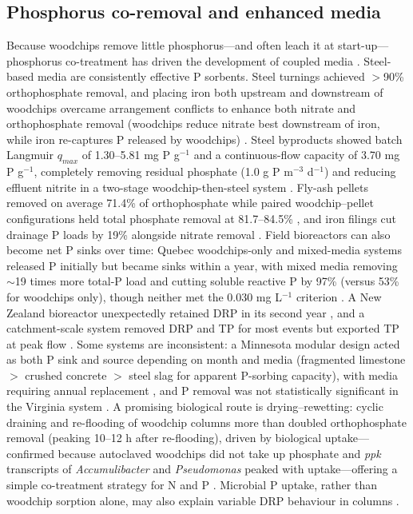 \documentclass[11pt]{article}
\begin{document}
\subsection{Phosphorus co-removal and enhanced media}

Because woodchips remove little phosphorus---and often leach it at start-up---phosphorus co-treatment has driven the development of coupled media \parencite{Christianson2021}. Steel-based media are consistently effective P sorbents. Steel turnings achieved $>$90\% orthophosphate removal, and placing iron both upstream and downstream of woodchips overcame arrangement conflicts to enhance both nitrate and orthophosphate removal (woodchips reduce nitrate best downstream of iron, while iron re-captures P released by woodchips) \parencite{Goodwin2015}. Steel byproducts showed batch Langmuir $q_{max}$ of 1.30--5.81 mg P g$^{-1}$ and a continuous-flow capacity of 3.70 mg P g$^{-1}$, completely removing residual phosphate (1.0 g P m$^{-3}$ d$^{-1}$) and reducing effluent nitrite in a two-stage woodchip-then-steel system \parencite{Hua2016}. Fly-ash pellets removed on average 71.4\% of orthophosphate while paired woodchip--pellet configurations held total phosphate removal at 81.7--84.5\% \parencite{Li2018b}, and iron filings cut drainage P loads by 19\% alongside nitrate removal \parencite{Oladeji2023}. Field bioreactors can also become net P sinks over time: Quebec woodchips-only and mixed-media systems released P initially but became sinks within a year, with mixed media removing $\sim$19 times more total-P load and cutting soluble reactive P by 97\% (versus 53\% for woodchips only), though neither met the 0.030 mg L$^{-1}$ criterion \parencite{Husk2018}. A New Zealand bioreactor unexpectedly retained DRP in its second year \parencite{Rivas2020}, and a catchment-scale system removed DRP and TP for most events but exported TP at peak flow \parencite{Feyereisen2023}. Some systems are inconsistent: a Minnesota modular design acted as both P sink and source depending on month and media (fragmented limestone $>$ crushed concrete $>$ steel slag for apparent P-sorbing capacity), with media requiring annual replacement \parencite{Strock2025}, and P removal was not statistically significant in the Virginia system \parencite{Bock2018}. A promising biological route is drying--rewetting: cyclic draining and re-flooding of woodchip columns more than doubled orthophosphate removal (peaking 10--12 h after re-flooding), driven by biological uptake---confirmed because autoclaved woodchips did not take up phosphate and \textit{ppk} transcripts of \textit{Accumulibacter} and \textit{Pseudomonas} peaked with uptake---offering a simple co-treatment strategy for N and P \parencite{Zhang2024b}. Microbial P uptake, rather than woodchip sorption alone, may also explain variable DRP behaviour in columns \parencite{Soupir2018}.
\end{document}
